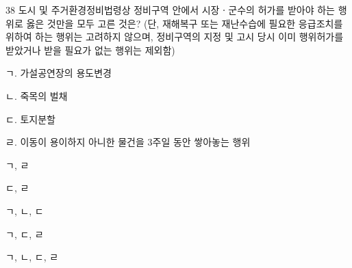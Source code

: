 \begin{question}{38}
도시 및 주거환경정비법령상 정비구역 안에서 시장ㆍ군수의 허가를 받아야 하는 행위로 옳은 것만을 모두 고른 것은? (단, 재해복구 또는 재난수습에 필요한 응급조치를 위하여 하는 행위는 고려하지 않으며, 정비구역의 지정 및 고시 당시 이미 행위허가를 받았거나 받을 필요가 없는 행위는 제외함)
\begin{framedtext}
ㄱ. 가설공연장의 용도변경 \par
ㄴ. 죽목의 벌채 \par
ㄷ. 토지분할 \par
ㄹ. 이동이 용이하지 아니한 물건을 3주일 동안 쌓아놓는 행위 \par
\end{framedtext}
\begin{choices}
  \item ㄱ, ㄹ
  \item ㄷ, ㄹ
  \item ㄱ, ㄴ, ㄷ
  \item ㄱ, ㄷ, ㄹ
  \item ㄱ, ㄴ, ㄷ, ㄹ
\end{choices}
\end{question}
